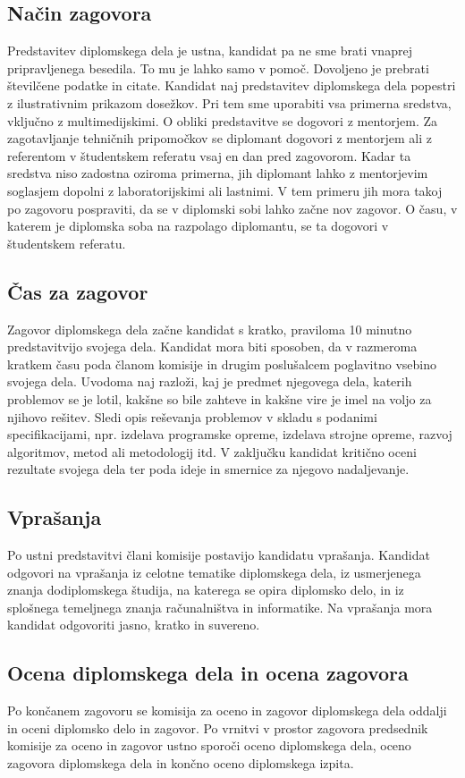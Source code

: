 \documentclass[12pt,a4paper,openany]{book}
\begin{document}
\subsection{Način zagovora}
Predstavitev diplomskega dela je ustna, kandidat pa ne sme brati vna\-prej pripravljenega besedila. To mu je lahko samo v pomoč. Dovoljeno je
pre\-brati številčene podatke in citate. Kandidat naj predstavitev diplomskega dela popestri z ilustrativnim prikazom dosežkov. Pri tem sme
uporabiti vsa primerna sredstva, vključno z multimedijskimi. O obliki predstavitve se dogovori z mentorjem. Za zagotavljanje tehničnih
pripomočkov se diplomant dogovori z mentorjem ali z referentom v štu\-dent\-skem referatu vsaj en dan pred zagovorom. Kadar ta sredstva niso
zadostna oziroma primerna, jih diplomant lahko z mentorjevim soglasjem dopolni z laboratorijskimi ali lastnimi. V tem primeru jih mora takoj po
zagovoru pospraviti, da se v diplomski sobi lahko začne nov zagovor. O času, v katerem je diplomska soba na razpolago diplomantu, se ta
dogovori v študentskem referatu.

\subsection{\v Cas za zagovor}
Zagovor diplomskega dela začne kandidat s kratko, praviloma 10 minutno predstavitvijo svojega dela. Kandidat mora biti sposoben, da v razmeroma
kratkem času poda članom komisije in drugim poslušalcem poglavitno vsebino svojega dela. Uvodoma naj razloži, kaj je predmet njegovega dela,
katerih problemov se je lotil, kakšne so bile zahteve in kakšne vire je imel na voljo za njihovo rešitev. Sledi opis reševanja problemov v
skladu s podanimi specifikacijami, npr. izdelava programske opreme, izdelava strojne opreme, razvoj algoritmov, metod ali metodologij itd. V
zaključku kandidat kritično oceni rezultate svojega dela ter poda ideje in smernice za njegovo nadaljevanje.

\subsection{Vpra\v sanja}
Po ustni predstavitvi člani komisije postavijo kandidatu vprašanja. Kandidat odgovori na vprašanja iz celotne tematike diplomskega dela, iz
usmerjenega znanja dodiplomskega študija, na katerega se opira diplomsko delo, in iz splošnega temeljnega znanja računalništva in informatike.
Na vprašanja mora kandidat odgovoriti jasno, kratko in suvereno.

\subsection{Ocena diplomskega dela in ocena zagovora}
Po končanem zagovoru se komisija za oceno in zagovor diplomskega dela oddalji in oceni diplomsko delo in zagovor. Po vrnitvi v prostor zagovora
predsednik komisije za oceno in zagovor ustno sporoči oceno diplomskega dela, oceno zagovora diplomskega dela in končno oceno diplomskega
izpita. 
\end{document}
